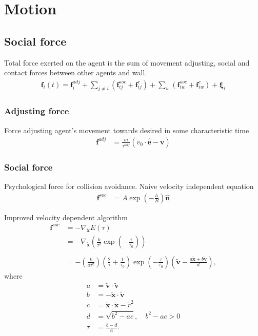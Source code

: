 \section{Motion}
\subsection{Social force}
Total force exerted on the agent is the sum of movement adjusting, social and contact forces between other agents and wall.
\begin{align}
\mathbf{f}_{i}(t) = \mathbf{f}_{i}^{adj} + \sum_{j\neq i}^{} \left(\mathbf{f}_{ij}^{soc} + \mathbf{f}_{ij}^{c}\right) + \sum_{w}^{} \left(\mathbf{f}_{iw}^{soc} + \mathbf{f}_{iw}^{c}\right) + \boldsymbol{\xi}_{i}
\end{align}


\subsubsection{Adjusting force}
Force adjusting agent's movement towards desired in some characteristic time \begin{align}
\mathbf{f}^{adj} &= \frac{m}{\tau^{adj}} (v_{0} \cdot \hat{\mathbf{e}} - \mathbf{v}) 
\end{align}


\subsubsection{Social force}
Psychological force for collision avoidance. Naive velocity independent equation
\begin{align}
\mathbf{f}^{soc} &= A \exp\left(-\frac{h}{B}\right) \hat{\mathbf{n}}
\end{align}

Improved velocity dependent algorithm
\begin{align}
\mathbf{f}^{soc} &= -\nabla_{\tilde{\mathbf{x}}} E(\tau)  \\
&= -\nabla_{\tilde{\mathbf{x}}} \left(\frac{k}{\tau^{2}} \exp \left( -\frac{\tau}{\tau_{0}} \right) \right) \\
\\
&= - \left(\frac{k}{a \tau^{2}}\right) 
\left(\frac{2}{\tau} + \frac{1}{\tau_{0}}\right) 
\exp\left (-\frac{\tau}{\tau_{0}}\right )
\left(\tilde{\mathbf{v}} -\frac{a \tilde{\mathbf{x}} + b \tilde{\mathbf{v}}}{d} \right),
\end{align}
where
\begin{align}
a &= \tilde{\mathbf{v}} \cdot \tilde{\mathbf{v}} \\
b &= -\tilde{\mathbf{x}} \cdot \tilde{\mathbf{v}} \\
c &= \tilde{\mathbf{x}} \cdot \tilde{\mathbf{x}} - \tilde{r}^{2} \\
d &= \sqrt{b^{2} - a c}, \quad b^{2} - a c > 0 \\
\tau &= \frac{b - d}{a}.
\end{align}


